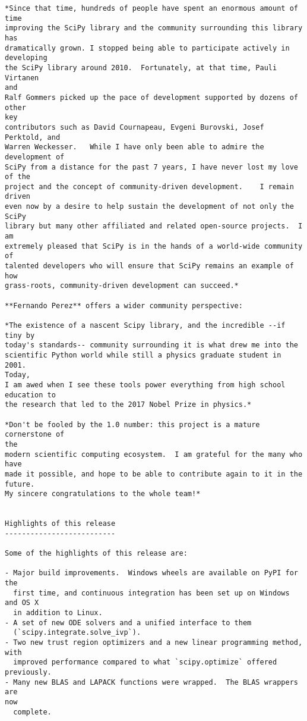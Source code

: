 \begin{verbatim}
*Since that time, hundreds of people have spent an enormous amount of time
improving the SciPy library and the community surrounding this library has
dramatically grown. I stopped being able to participate actively in
developing
the SciPy library around 2010.  Fortunately, at that time, Pauli Virtanen
and
Ralf Gommers picked up the pace of development supported by dozens of other
key
contributors such as David Cournapeau, Evgeni Burovski, Josef Perktold, and
Warren Weckesser.   While I have only been able to admire the development of
SciPy from a distance for the past 7 years, I have never lost my love of the
project and the concept of community-driven development.    I remain driven
even now by a desire to help sustain the development of not only the SciPy
library but many other affiliated and related open-source projects.  I am
extremely pleased that SciPy is in the hands of a world-wide community of
talented developers who will ensure that SciPy remains an example of how
grass-roots, community-driven development can succeed.*

**Fernando Perez** offers a wider community perspective:

*The existence of a nascent Scipy library, and the incredible --if tiny by
today's standards-- community surrounding it is what drew me into the
scientific Python world while still a physics graduate student in 2001.
Today,
I am awed when I see these tools power everything from high school
education to
the research that led to the 2017 Nobel Prize in physics.*

*Don't be fooled by the 1.0 number: this project is a mature cornerstone of
the
modern scientific computing ecosystem.  I am grateful for the many who have
made it possible, and hope to be able to contribute again to it in the
future.
My sincere congratulations to the whole team!*


Highlights of this release
--------------------------

Some of the highlights of this release are:

- Major build improvements.  Windows wheels are available on PyPI for the
  first time, and continuous integration has been set up on Windows and OS X
  in addition to Linux.
- A set of new ODE solvers and a unified interface to them
  (`scipy.integrate.solve_ivp`).
- Two new trust region optimizers and a new linear programming method, with
  improved performance compared to what `scipy.optimize` offered previously.
- Many new BLAS and LAPACK functions were wrapped.  The BLAS wrappers are
now
  complete.



\end{verbatim}
